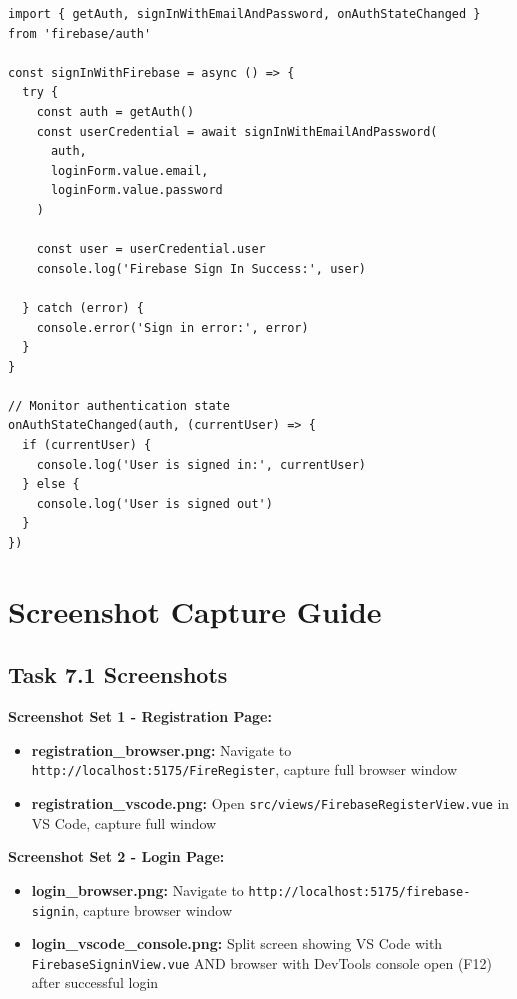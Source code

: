 \documentclass[11pt,a4paper]{article}
\begin{document}
\begin{lstlisting}[caption=Key sign-in function from FirebaseSigninView.vue]
import { getAuth, signInWithEmailAndPassword, onAuthStateChanged } from 'firebase/auth'

const signInWithFirebase = async () => {
  try {
    const auth = getAuth()
    const userCredential = await signInWithEmailAndPassword(
      auth, 
      loginForm.value.email, 
      loginForm.value.password
    )
    
    const user = userCredential.user
    console.log('Firebase Sign In Success:', user)
    
  } catch (error) {
    console.error('Sign in error:', error)
  }
}

// Monitor authentication state
onAuthStateChanged(auth, (currentUser) => {
  if (currentUser) {
    console.log('User is signed in:', currentUser)
  } else {
    console.log('User is signed out')
  }
})
\end{lstlisting}

\newpage


\section{Screenshot Capture Guide}

\subsection{Task 7.1 Screenshots}

\textbf{Screenshot Set 1 - Registration Page:}
\begin{itemize}
    \item \textbf{registration\_browser.png:} Navigate to \texttt{http://localhost:5175/FireRegister}, capture full browser window
    \item \textbf{registration\_vscode.png:} Open \texttt{src/views/FirebaseRegisterView.vue} in VS Code, capture full window
\end{itemize}

\textbf{Screenshot Set 2 - Login Page:}
\begin{itemize}
    \item \textbf{login\_browser.png:} Navigate to \texttt{http://localhost:5175/firebase-signin}, capture browser window
    \item \textbf{login\_vscode\_console.png:} Split screen showing VS Code with \texttt{FirebaseSigninView.vue} AND browser with DevTools console open (F12) after successful login
\end{itemize}
\end{document}
